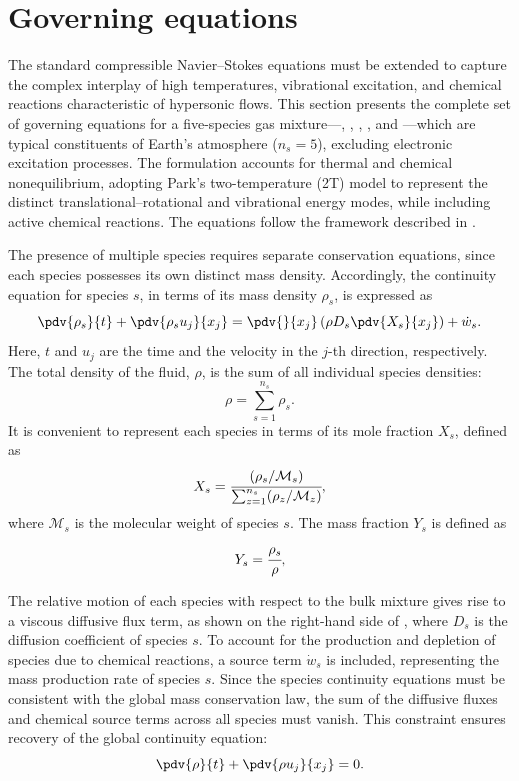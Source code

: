 \chapter{Governing equations}\label{chapter:governing_equations}
The standard compressible Navier--Stokes equations must be extended to capture the complex interplay of high temperatures, vibrational excitation, and chemical reactions characteristic of hypersonic flows. This section presents the complete set of governing equations for a five-species gas mixture---, , , , and ---which are typical constituents of Earth's atmosphere ($n_s = 5$), excluding electronic excitation processes. The formulation accounts for thermal and chemical nonequilibrium, adopting Park's two-temperature (2T) model to represent the distinct translational--rotational and vibrational energy modes, while including active chemical reactions. The equations follow the framework described in \citet{Gnoffo1989, Park1990}.

The presence of multiple species requires separate conservation equations, since each species possesses its own distinct mass density. Accordingly, the continuity equation for species $s$, in terms of its mass density $\rho_s$, is expressed as
\begin{equation}\label{equation:global_species_continuity}
    \pdv{\rho_s}{t} + \pdv{\rho_s u_{j}}{x_{j}} = \pdv{}{x_{j}} \left( \rho D_s \pdv{X_s}{x_{j}} \right) + \dot{w}_s.
\end{equation}
Here, $t$ and $u_j$ are the time and the velocity in the $j$-th direction, respectively. The total density of the fluid, $\rho$, is the sum of all individual species densities:
\begin{equation}
    \rho = \sum^{n_s}_{s=1} \rho_s.
\end{equation}
It is convenient to represent each species in terms of its mole fraction $X_s$, defined as
\begin{equation}
    X_s = \cfrac{(\rho_s/\mathcal{M}_s)}{\sum_{z=1}^{n_s} (\rho_z/\mathcal{M}_z)},
\end{equation}
where $\mathcal{M}_s$ is the molecular weight of species $s$. The mass fraction $Y_s$ is defined as
\begin{equation}
    Y_s = \cfrac{\rho_s}{\rho},
\end{equation}

The relative motion of each species with respect to the bulk mixture gives rise to a viscous diffusive flux term, as shown on the right-hand side of , where $D_s$ is the diffusion coefficient of species $s$. To account for the production and depletion of species due to chemical reactions, a source term $\dot{w}_s$ is included, representing the mass production rate of species $s$. Since the species continuity equations must be consistent with the global mass conservation law, the sum of the diffusive fluxes and chemical source terms across all species must vanish. This constraint ensures recovery of the global continuity equation:
\begin{equation}\label{equation:global_continuity}
    \pdv{\rho}{t} + \pdv{\rho u_j}{x_j} = 0.
\end{equation}

